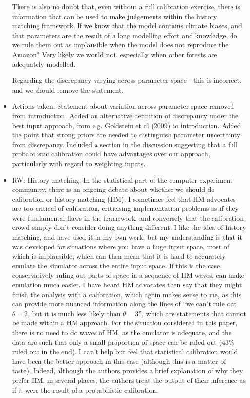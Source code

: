 \documentclass[esd, manuscript]{copernicus}
\begin{document}
\begin{itemize}
{There is also no doubt that, even without a full calibration exercise, there is information that can be used to make judgements within the history matching framework. If we know that the model contains climate biases, and  that parameters are the result of a long modelling effort and knowledge, do we rule them out as implausible when the model does not reproduce the Amazon? Very likely we would not, especially when other forests are adequately modelled.

Regarding the discrepancy varying across parameter space - this is incorrect, and we should remove the statement.}

\item{Actions taken: Statement about variation across parameter space removed from introduction.
Added an alternative definition of discrepancy under the best input approach, from e.g. Goldstein et al (2009) to introduction.
Added the point that strong priors are needed to distinguish parameter uncertainty from discrepancy.
Included a section in the discussion suggesting that a full probabilistic calibration could have advantages over our approach, particularly with regard to weighting inputs.}


\item{RW: History matching. In the statistical part of the computer experiment community, there is an ongoing debate about whether we should do calibration or history matching (HM). I sometimes feel that HM advocates are too critical of calibration, criticising implementation problems as if they were fundamental flaws in the framework, and conversely that the calibration crowd simply don't consider doing anything different. I like the idea of history matching, and have used it in my own work, but my understanding is that it was developed for situations where you have a huge input space, most of which is implausible, which can then mean that it is hard to accurately emulate the simulator across the entire input space. If this is the case, conservatively ruling out parts of space in a sequence of HM waves, can make emulation much easier. I have heard HM advocates then say that they might finish the analysis with a calibration, which again makes sense to me, as this can provide more nuanced information along the lines of ``we can't rule out $\theta=2$, but it is much less likely than $\theta=3$'', which are statements that cannot be made within a HM approach. For the situation considered in this paper, there is no need to do waves of HM, as the emulator is adequate, and the data are such that only a small proportion of space can be ruled out (43\% ruled out in the end). I can't help but feel that statistical calibration would have been the better approach in this case (although this is a matter of taste). Indeed, although the authors provides a brief explanation of why they prefer HM, in several places, the authors treat the output of their inference as if it were the result of a probabilistic calibration.}


\end{itemize}
\end{document}
